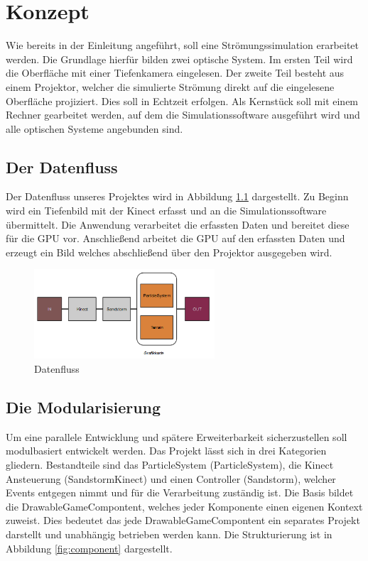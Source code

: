 \chapter{Konzept}
\begin{Spacing}{\mylinespace}

Wie bereits in der Einleitung angeführt, soll eine Strömungssimulation erarbeitet werden. Die Grundlage hierfür bilden zwei optische System. Im ersten Teil wird die Oberfläche mit einer Tiefenkamera eingelesen. Der zweite Teil besteht aus einem Projektor, welcher die simulierte Strömung direkt auf die eingelesene Oberfläche projiziert. Dies soll in Echtzeit erfolgen. Als Kernstück soll mit einem Rechner gearbeitet werden, auf dem die Simulationssoftware ausgeführt wird und alle optischen Systeme angebunden sind.

\section{Der Datenfluss}
Der Datenfluss unseres Projektes  wird in Abbildung \ref{fig:dataFlow} dargestellt. Zu Beginn wird ein Tiefenbild mit der Kinect erfasst und an die Simulationssoftware übermittelt. Die Anwendung verarbeitet die erfassten Daten und bereitet diese für die GPU vor. Anschließend arbeitet die GPU auf den erfassten Daten und erzeugt ein Bild welches abschließend über den Projektor ausgegeben wird.

\begin{figure}[h!]
	\centering
	\vspace*{20px}
	\includegraphics[width=0.6\textwidth]{graphics/flow.png}
	\caption{Datenfluss}
	\label{fig:dataFlow}
\end{figure}

\section{Die Modularisierung}
Um eine parallele Entwicklung und spätere Erweiterbarkeit sicherzustellen soll modulbasiert entwickelt werden. Das Projekt lässt sich in drei Kategorien gliedern. Bestandteile sind das ParticleSystem (ParticleSystem), die Kinect Ansteuerung (SandstormKinect) und einen Controller (Sandstorm), welcher Events entgegen nimmt und für die Verarbeitung zuständig ist. Die Basis bildet die DrawableGameCompontent, welches jeder Komponente einen eigenen Kontext zuweist. Dies bedeutet das jede DrawableGameCompontent ein separates Projekt darstellt und unabhängig betrieben werden kann. Die Strukturierung ist in Abbildung \ref{fig:component} dargestellt.


\end{Spacing}
